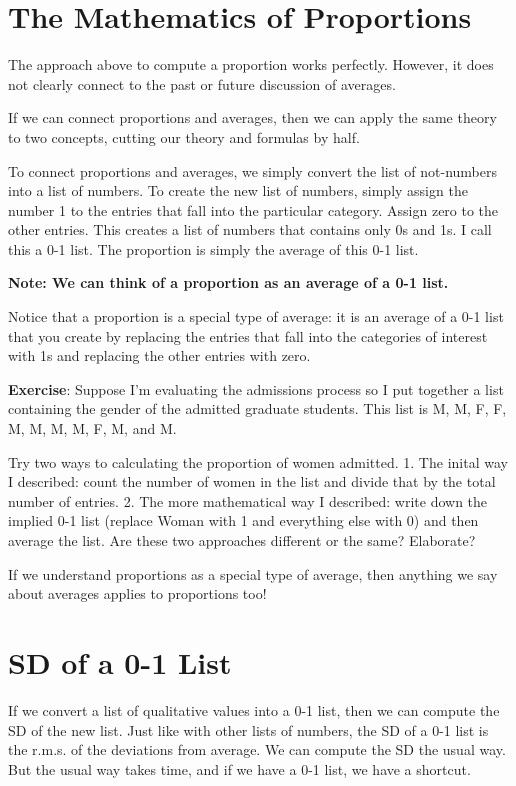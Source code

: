 \documentclass[]{book}
\theoremstyle{definition}
\theoremstyle{definition}
\theoremstyle{definition}
\theoremstyle{remark}
\begin{document}
\section{The Mathematics of
Proportions}\label{the-mathematics-of-proportions}

The approach above to compute a proportion works perfectly. However, it
does not clearly connect to the past or future discussion of averages.

If we can connect proportions and averages, then we can apply the same
theory to two concepts, cutting our theory and formulas by half.

To connect proportions and averages, we simply convert the list of
not-numbers into a list of numbers. To create the new list of numbers,
simply assign the number 1 to the entries that fall into the particular
category. Assign zero to the other entries. This creates a list of
numbers that contains only 0s and 1s. I call this a 0-1 list. The
proportion is simply the average of this 0-1 list.

\textbf{Note: We can think of a proportion as an average of a 0-1 list.}

Notice that a proportion is a special type of average: it is an average
of a 0-1 list that you create by replacing the entries that fall into
the categories of interest with 1s and replacing the other entries with
zero.

\textbf{Exercise}: Suppose I'm evaluating the admissions process so I
put together a list containing the gender of the admitted graduate
students. This list is M, M, F, F, M, M, M, M, F, M, and M.

Try two ways to calculating the proportion of women admitted. 1. The
inital way I described: count the number of women in the list and divide
that by the total number of entries. 2. The more mathematical way I
described: write down the implied 0-1 list (replace Woman with 1 and
everything else with 0) and then average the list. Are these two
approaches different or the same? Elaborate?

If we understand proportions as a special type of average, then anything
we say about averages applies to proportions too!

\section{SD of a 0-1 List}\label{sd-of-a-0-1-list}

If we convert a list of qualitative values into a 0-1 list, then we can
compute the SD of the new list. Just like with other lists of numbers,
the SD of a 0-1 list is the r.m.s. of the deviations from average. We
can compute the SD the usual way. But the usual way takes time, and if
we have a 0-1 list, we have a shortcut.
\end{document}
